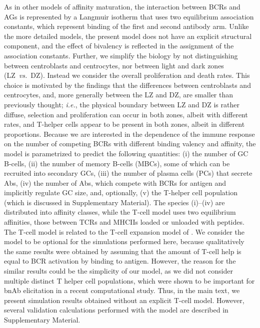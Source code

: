 \documentclass[utf8]{frontiersHLTH}%
\newcommand{\cred}[1]{\textsf{\color{red}#1}}
\newcommand{\vo}[1]{#1} %
\def\ie {{\it i.e.}}
\def\vs {{\it vs.}}
\newcommand{\SI}{Supplementary Material}
\begin{document}
As in other models of affinity maturation,\cite{zhang10,wang15} the
interaction between BCRs and AGs is represented by a Langmuir
isotherm that uses two equilibrium association constants, which represent
binding of the first and second antibody arm.  
Unlike the more detailed models,\cite{robert18,amitai20} 
the present model does not have an explicit structural component,
and the effect of bivalency is reflected in the assignment of the association constants.
Further, we simplify the \vo{biology} by not distinguishing between centroblasts and centrocytes, nor
between light and dark zones (LZ~\vs~DZ).  Instead we consider the overall
proliferation and death rates. This choice is motivated by the findings
that the differences between centroblasts and centrocytes, and, more
generally between the LZ and DZ, are smaller than previously
thought;\cite{allen07} \ie, the physical boundary between LZ and DZ is
rather diffuse, selection and proliferation can occur in both zones,
albeit with different rates, and T-helper cells appear to be present in
both zones, albeit in different proportions. Because we are interested
in the dependence of the immune response on the
number of competing BCRs with different binding valency and affinity, the model is parametrized
to \vo{predict} the following quantities: (i) the number of GC B-cells, (ii) the
number of memory
B-cells (MBCs), some of which can be recruited into secondary GCs, (iii) the
number of plasma
cells (PCs) that secrete Abs, (iv) the number of Abs, which compete with BCRs for
antigen and implicitly regulate GC size,\cite{zhang13} and, optionally, (v) the T-helper cell
population (which is discussed in \SI). The species (i)--(iv) are distributed into affinity classes,
while the T-cell model uses two equilibrium affinities, those between TCRs
and MHCIIs loaded or unloaded with peptides. The T-cell model is related
to the T-cell expansion model of \citet{mayer19}.  We consider the model to be 
optional for the simulations performed here, because \cred{qualitatively the
same results were obtained by assuming that the amount of T-cell help is
equal to BCR activation by binding to antigen.  However, the reason for the 
similar results could be the simplicity of our model, as we did not consider
multiple distinct T helper cell populations, which were shown to be important for bnAb elicitation in a recent computational study.\cite{erwin20}}
%
\cred{Thus, in the main text, we present simulation results obtained without an explicit T-cell model.
However, several validation calculations performed with the model are described in \SI.}
\end{document}
